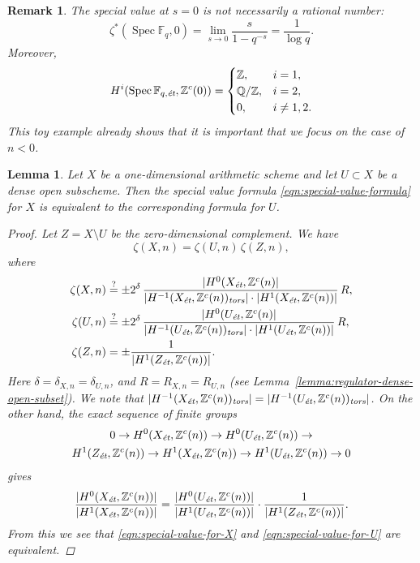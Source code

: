 \documentclass[draft]{article}
\DeclareMathOperator{\Spec}{Spec}
\newcommand{\FF}{\mathbb{F}}
\newcommand{\QQ}{\mathbb{Q}}
\newcommand{\ZZ}{\mathbb{Z}}
\newcommand{\et}{\text{\it \'{e}t}}
\newcommand{\tors}{\text{\it tors}}
\theoremstyle{myplain}
\newtheorem{lemma}[theorem]{Lemma}
\theoremstyle{mydefinition}
\newtheorem{remark}[theorem]{Remark}
\begin{document}
\begin{remark}
  The special value at $s = 0$ is not necessarily a rational number:
  \[ \zeta^* (\Spec \FF_q, 0) =
    \lim_{s \to 0} \frac{s}{1 - q^{-s}} =
    \frac{1}{\log q}. \]
  Moreover,
  \[ H^i (\Spec \FF_{q,\et}, \ZZ^c (0)) =
    \begin{cases}
      \ZZ, & i = 1, \\
      \QQ/\ZZ, & i = 2, \\
      0, & i \ne 1,2.
    \end{cases} \]
  This toy example already shows that it is important that we focus on the case
  of $n < 0$.
\end{remark}

\begin{lemma}
  \label{lemma:elementary-proof-2}
  Let $X$ be a one-dimensional arithmetic scheme and let $U \subset X$ be a
  dense open subscheme. Then the special value formula
  \eqref{eqn:special-value-formula} for $X$ is equivalent to the corresponding
  formula for $U$.

  \begin{proof}
    Let $Z = X\setminus U$ be the zero-dimensional complement. We have
    $$\zeta (X,n) = \zeta (U,n)\,\zeta (Z,n),$$
    where
    \begin{align}
      \label{eqn:special-value-for-X} \zeta (X,n) & \stackrel{?}{=} \pm 2^\delta\,\frac{|H^0 (X_\et, \ZZ^c (n)|}{|H^{-1} (X_\et, \ZZ^c (n))_\tors| \cdot |H^1 (X_\et, \ZZ^c (n))|}\,R, \\
      \label{eqn:special-value-for-U} \zeta (U,n) & \stackrel{?}{=} \pm 2^\delta\,\frac{|H^0 (U_\et, \ZZ^c (n)|}{|H^{-1} (U_\et, \ZZ^c (n))_\tors| \cdot |H^1 (U_\et, \ZZ^c (n))|}\,R, \\
      \notag \zeta (Z,n) & = \pm\frac{1}{|H^1 (Z_\et, \ZZ^c (n))|}.
    \end{align}
    Here $\delta = \delta_{X,n} = \delta_{U,n}$, and $R = R_{X,n} = R_{U,n}$
    (see Lemma~\ref{lemma:regulator-dense-open-subset}). We note that
    $|H^{-1} (X_\et, \ZZ^c (n))_\tors| = |H^{-1} (U_\et, \ZZ^c (n))_\tors|$.
    On the other hand, the exact sequence of finite groups
    \begin{multline}
      0 \to H^0 (X_\et, \ZZ^c (n)) \to
      H^0 (U_\et, \ZZ^c (n)) \to \\
      H^1 (Z_\et, \ZZ^c (n)) \to
      H^1 (X_\et, \ZZ^c (n)) \to
      H^1 (U_\et, \ZZ^c (n)) \to 0
    \end{multline}
    gives
    \[ \frac{|H^0 (X_\et, \ZZ^c (n))|}{|H^1 (X_\et, \ZZ^c (n))|} =
      \frac{|H^0 (U_\et, \ZZ^c (n))|}{|H^1 (U_\et, \ZZ^c (n))|}\cdot
      \frac{1}{|H^1 (Z_\et, \ZZ^c (n))|}. \]
    From this we see that \eqref{eqn:special-value-for-X} and
    \eqref{eqn:special-value-for-U} are equivalent.
  \end{proof}
\end{lemma}
\end{document}
